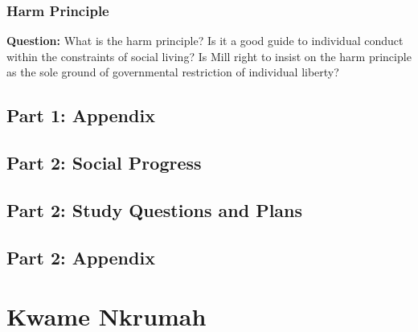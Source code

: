 \documentclass[12pt, letterpaper]{article}
\begin{document}
\subsubsection{Harm Principle}
\textbf{Question:} What is the harm principle? Is it a good guide to individual conduct within the constraints of social living? Is Mill right to insist on the harm principle as the sole ground of governmental restriction of individual liberty?





\subsection{Part 1: Appendix}



\subsection{Part 2: Social Progress}

\subsection{Part 2: Study Questions and Plans}

\subsection{Part 2: Appendix}



\newpage
\section{Kwame Nkrumah}
\end{document}
